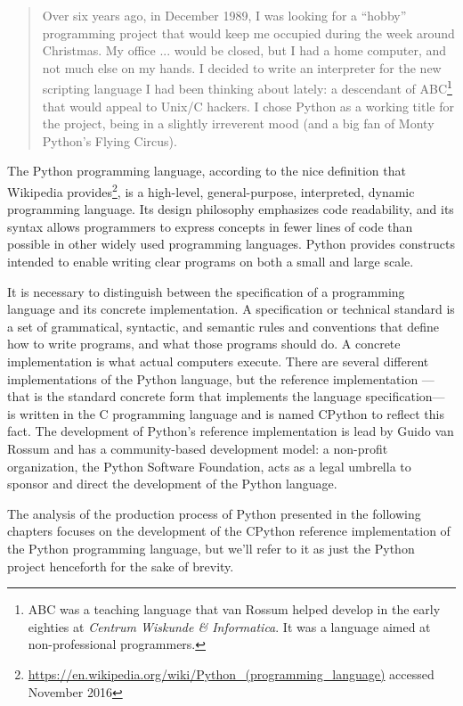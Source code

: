 \begin{quote}
Over six years ago, in December 1989, I was looking for a ``hobby'' programming project that would keep me occupied during the week around Christmas. My office ... would be closed, but I had a home computer, and not much else on my hands. I decided to write an interpreter for the new scripting language I had been thinking about lately: a descendant of ABC\footnote{ABC was a teaching language that van Rossum helped develop in the early eighties at \emph{Centrum   Wiskunde \& Informatica}. It was a language aimed at non-professional programmers.} that would appeal to Unix/C hackers. I chose Python as a working title for the project, being in a slightly irreverent mood (and a big fan of Monty Python's Flying Circus).
\end{quote}

The Python programming language, according to the nice definition that Wikipedia provides\footnote{\href{https://en.wikipedia.org/wiki/Python_(programming_language)}{https://en.wikipedia.org/wiki/Python\_(programming\_language)} accessed November 2016}, is a high-level, general-purpose, interpreted, dynamic programming language. Its design philosophy emphasizes code readability, and its syntax allows programmers to express concepts in fewer lines of code than possible in other widely used programming languages. Python provides constructs intended to enable writing clear programs on both a small and large scale.

It is necessary to distinguish between the specification of a programming language and its concrete implementation. A specification or technical standard is a set of grammatical, syntactic, and semantic rules and conventions that define how to write programs, and what those programs should do. A concrete implementation is what actual computers execute. There are several different implementations of the Python language, but the reference implementation ---that is the standard concrete form that implements the language specification--- is written in the C programming language and is named CPython to reflect this fact. The development of Python's reference implementation is lead by Guido van Rossum and has a community-based development model: a non-profit organization, the Python Software Foundation, acts as a legal umbrella to sponsor and direct the development of the Python language.

The analysis of the production process of Python presented in the following chapters focuses on the development of the CPython reference implementation of the Python programming language, but we'll refer to it as just the Python project henceforth for the sake of brevity.    

